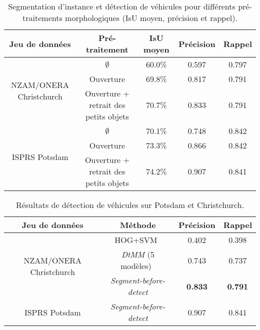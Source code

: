 \begin{table}[t]
\centering
  \caption{Segmentation d'instance et détection de véhicules pour différents pré-traitements morphologiques (\gls{IsU} moyen, précision et rappel).}
  \label{table:morpho_results}
  \begin{tabular}{ccccc}
  \toprule
  \textbf{Jeu de données} & \textbf{Pré-traitement} & \textbf{\gls{IsU} moyen} & \textbf{Précision} & \textbf{Rappel}\\
  \midrule
  \multirow{3}{*}{NZAM/ONERA Christchurch} & $\emptyset$ & 60.0\% & 0.597 & 0.797\\
  & Ouverture & 69.8\% & 0.817 & 0.791\\
  & Ouverture + retrait des petits objets & 70.7\% & 0.833 & 0.791\\
  \midrule
  \multirow{3}{*}{ISPRS Potsdam} & $\emptyset$ & 70.1\% & 0.748 & 0.842\\
  & Ouverture & 73.3\% & 0.866 & 0.842\\
  & Ouverture + retrait des petits objets & 74.2\% & 0.907 & 0.841\\
  \bottomrule
  \end{tabular}
\end{table}
\unskip
\begin{table}[t]
\centering
  \caption{Résultats de détection de véhicules sur Potsdam et Christchurch.}
  \label{table:detection_results}
  \begin{tabular}{cccc}
  \toprule
  \textbf{Jeu de données} & \textbf{Méthode} & \textbf{Précision} & \textbf{Rappel}\\
  \midrule
  \multirow{3}{*}{NZAM/ONERA Christchurch} & HOG+SVM~\cite{michel_local_2011} & 0.402 & 0.398\\
  & \emph{DtMM} (5 modèles)~\cite{randrianarivo_contextual_2016} & 0.743 & 0.737\\
  & \emph{Segment-before-detect} & \textbf{0.833} & \textbf{0.791}\\
  \midrule
  ISPRS Potsdam & \emph{Segment-before-detect} & 0.907 & 0.841\\
  \bottomrule
  \end{tabular}
\end{table}

